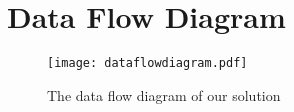 \section{Data Flow Diagram}
 \begin{figure}[H]
\texttt{[image: dataflowdiagram.pdf]}
\caption{The data flow diagram of our solution}
\label{fig:dataFlowDiagram}
\end{figure}